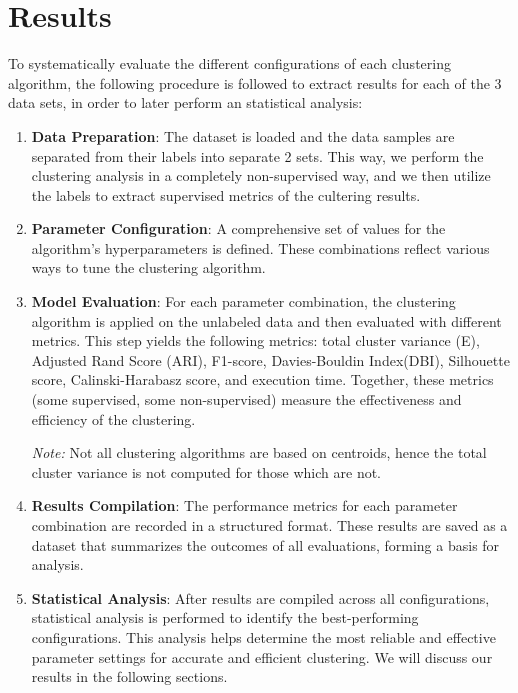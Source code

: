 \section{Results}\label{sec:results}
To systematically evaluate the different configurations of each clustering algorithm, the following procedure is followed to extract results for each of the 3 data sets, in order to later perform an statistical analysis:

\begin{enumerate}
    \item \textbf{Data Preparation}: The dataset is loaded and the data samples are separated from their labels into separate 2 sets. This way, we perform the clustering analysis in a completely non-supervised way, and we then utilize the labels to extract supervised metrics of the cultering results.

    \item \textbf{Parameter Configuration}: A comprehensive set of values for the algorithm's hyperparameters is defined. These combinations reflect various ways to tune the clustering algorithm.

    \item \textbf{Model Evaluation}: For each parameter combination, the clustering algorithm is applied on the unlabeled data and then evaluated with different metrics. This step yields the following metrics: total cluster variance (E), Adjusted Rand Score (ARI), F1-score, Davies-Bouldin Index(DBI), Silhouette score, Calinski-Harabasz score, and execution time. Together, these metrics (some supervised, some non-supervised) measure the effectiveness and efficiency of the clustering.
    
    \textit{Note:} Not all clustering algorithms are based on centroids, hence the total cluster variance is not computed for those which are not.

    \item \textbf{Results Compilation}: The performance metrics for each parameter combination are recorded in a structured format. These results are saved as a dataset that summarizes the outcomes of all evaluations, forming a basis for analysis.

    \item \textbf{Statistical Analysis}: After results are compiled across all configurations, statistical analysis is performed to identify the best-performing configurations. This analysis helps determine the most reliable and effective parameter settings for accurate and efficient clustering. We will discuss our results in the following sections.
\end{enumerate}

